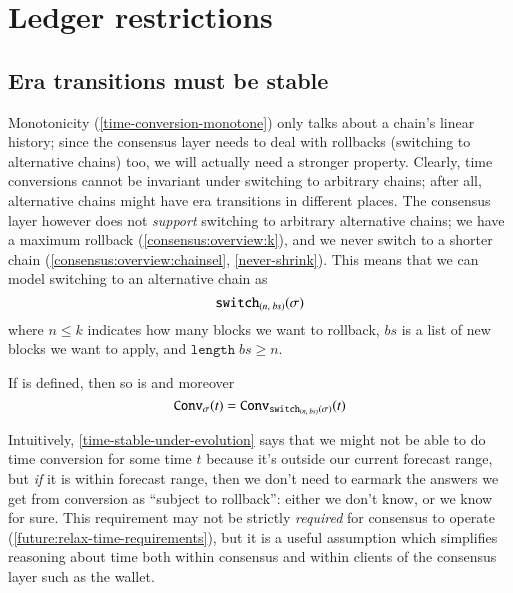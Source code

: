 \section{Ledger restrictions}
\label{time:ledgerrestrictions}

\subsection{Era transitions must be stable}

Monotonicity (\cref{time-conversion-monotone}) only talks about a chain's linear
history; since the consensus layer needs to deal with rollbacks (switching to
alternative chains) too, we will actually need a stronger property. Clearly,
time conversions cannot be invariant under switching to arbitrary chains; after
all, alternative chains might have era transitions in different places. The
consensus layer however does not \emph{support} switching to arbitrary
alternative chains; we have a maximum rollback (\cref{consensus:overview:k}),
and we never switch to a shorter chain (\cref{consensus:overview:chainsel},
\cref{never-shrink}). This means that we can model switching to an alternative
chain as $$\mathtt{switch}_{(\mathit{n},\;\mathit{bs})}(\sigma)$$ where $n \le k$ indicates how many blocks we
want to rollback, $\mathit{bs}$ is a list of new blocks we want to apply, and
$\mathtt{length} \; \mathit{bs} \ge n$.

\begin{property}
\label{time-stable-under-evolution}
If  is defined, then so is
and moreover
\begin{equation*}
  \mathtt{Conv}_{\sigma}(t)
= \mathtt{Conv}_{\mathtt{switch}_{(\mathit{n},\;\mathit{bs})}(\sigma)}(t)
\end{equation*}
\end{property}

Intuitively, \cref{time-stable-under-evolution} says that we might not be able
to do time conversion for some time $t$ because it's outside our current forecast
range, but \emph{if} it is within forecast range, then we don't need to earmark
the answers we get from conversion as ``subject to rollback'': either we don't
know, or we know for sure. This requirement may not be strictly \emph{required}
for consensus to operate (\cref{future:relax-time-requirements}), but it is
a useful assumption which simplifies reasoning about time both within consensus
and within clients of the consensus layer such as the wallet.

